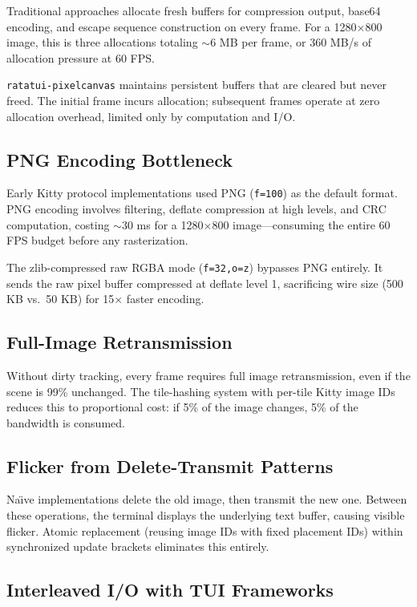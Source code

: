\documentclass[11pt, a4paper, twocolumn]{article}
\begin{document}
Traditional approaches allocate fresh buffers for compression output, base64 encoding, and escape sequence construction on every frame.
For a 1280$\times$800 image, this is three allocations totaling $\sim$6 MB per frame, or 360 MB/s of allocation pressure at 60 FPS.

\texttt{ratatui-pixelcanvas} maintains persistent buffers that are cleared but never freed.
The initial frame incurs allocation; subsequent frames operate at zero allocation overhead, limited only by computation and I/O.

\subsection{PNG Encoding Bottleneck}

Early Kitty protocol implementations used PNG (\texttt{f=100}) as the default format.
PNG encoding involves filtering, deflate compression at high levels, and CRC computation, costing $\sim$30 ms for a 1280$\times$800 image---consuming the entire 60 FPS budget before any rasterization.

The zlib-compressed raw RGBA mode (\texttt{f=32,o=z}) bypasses PNG entirely.
It sends the raw pixel buffer compressed at deflate level 1, sacrificing wire size (500 KB vs.\ 50 KB) for 15$\times$ faster encoding.

\subsection{Full-Image Retransmission}

Without dirty tracking, every frame requires full image retransmission, even if the scene is 99\% unchanged.
The tile-hashing system with per-tile Kitty image IDs reduces this to proportional cost: if 5\% of the image changes, 5\% of the bandwidth is consumed.

\subsection{Flicker from Delete-Transmit Patterns}

Na\"{\i}ve implementations delete the old image, then transmit the new one.
Between these operations, the terminal displays the underlying text buffer, causing visible flicker.
Atomic replacement (reusing image IDs with fixed placement IDs) within synchronized update brackets eliminates this entirely.

\subsection{Interleaved I/O with TUI Frameworks}
\end{document}
